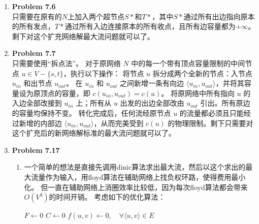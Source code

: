 \documentclass{ctexart}
\begin{document}
\begin{enumerate}[label=\arabic*.]
        综上所述，在辅助网络 $N(f)$ 中，各边容量均为 1，且所有的中间点依然严格满足或者入度为 1 或者出度为 1 的结构性质。因此，$N(f)$ 仍然是简单容量网络。
    \item \textbf{Problem 7.6}\\
        只需要在原有的$N$上加入两个超节点$S*$和$T*$，其中$S*$通过所有出边指向原本的所有发点，$T*$通过所有入边连接原本的所有收点，且所有边容量都为$+\infty$。剩下对这个扩充网络解最大流问题就可以了。
    \item \textbf{Problem 7.7}\\
        只需要使用“拆点法”。
        对于原网络 $N$ 中的每一个带有顶点容量限制的中间节点 $u \in V - \{s, t\}$，执行以下操作：
        将节点 $u$ 拆分成两个全新的节点：入节点 $u_{in}$ 和出节点 $u_{out}$。
        在 $u_{in}$ 和 $u_{out}$ 之间新增一条有向边 $\langle u_{in}, u_{out} \rangle$，并将其容量设为原顶点的容量，即 $c(u_{in}, u_{out}) = c(u)$。
        将原网络中所有指向 $u$ 的入边全部改接到 $u_{in}$ 上；所有从 $u$ 出发的出边全部改由 $u_{out}$ 引出。所有原边的容量均保持不变。
        转化完成后，任何流经原节点 $u$ 的流量都必须且只能经过新增的内部边 $\langle u_{in}, u_{out} \rangle$，从而完美受到 $c(u)$ 的物理限制。剩下只需要对这个扩充后的新网络解标准的最大流问题就可以了。
    \item \textbf{Problem 7.17}
        \begin{enumerate}[label=(\arabic*)]
            \item 一个简单的想法是直接先调用dinic算法求出最大流，然后以这个求出的最大流量作为输入，用floyd算法在辅助网络上找负权环路，使得费用最小化。
                但一直在辅助网络上消圈效率比较低，因为每次floyd算法都会带来$O(V^3)$的时间开销。
                考虑如下的优化算法：\\
                \begin{algorithm}[H]
                \caption{连续最短路算法 (Successive Shortest Path, SSP)}
                \label{algo:ssp}
                
                $F \leftarrow 0$\;
                $C \leftarrow 0$\;
                $f(u,v) \leftarrow 0, \quad \forall \langle u,v \rangle \in E$\;
                
\end{algorithm}
\end{enumerate}
\end{enumerate}
\end{document}
